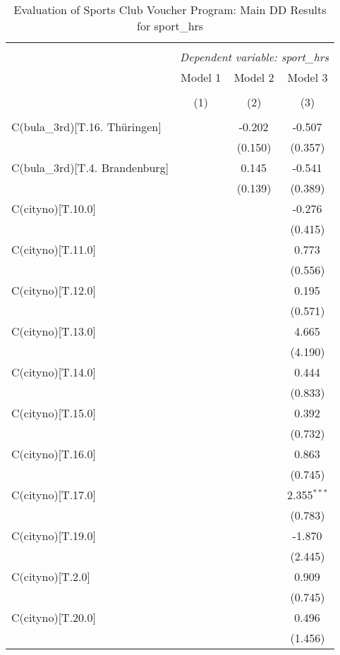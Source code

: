 \begin{table}[!htbp] \centering
  \caption{Evaluation of Sports Club Voucher Program: Main DD Results for sport_hrs}
\begin{tabular}{@{\extracolsep{5pt}}lccc}
\\[-1.8ex]\hline
\hline \\[-1.8ex]
& \multicolumn{3}{c}{\textit{Dependent variable: sport_hrs}} \
\cr \cline{2-4}
\\[-1.8ex] & \multicolumn{1}{c}{Model 1} & \multicolumn{1}{c}{Model 2} & \multicolumn{1}{c}{Model 3}  \\
\\[-1.8ex] & (1) & (2) & (3) \\
\hline \\[-1.8ex]
 C(bula_3rd)[T.16. Thüringen] & & -0.202$^{}$ & -0.507$^{}$ \\
& & (0.150) & (0.357) \\
 C(bula_3rd)[T.4. Brandenburg] & & 0.145$^{}$ & -0.541$^{}$ \\
& & (0.139) & (0.389) \\
 C(cityno)[T.10.0] & & & -0.276$^{}$ \\
& & & (0.415) \\
 C(cityno)[T.11.0] & & & 0.773$^{}$ \\
& & & (0.556) \\
 C(cityno)[T.12.0] & & & 0.195$^{}$ \\
& & & (0.571) \\
 C(cityno)[T.13.0] & & & 4.665$^{}$ \\
& & & (4.190) \\
 C(cityno)[T.14.0] & & & 0.444$^{}$ \\
& & & (0.833) \\
 C(cityno)[T.15.0] & & & 0.392$^{}$ \\
& & & (0.732) \\
 C(cityno)[T.16.0] & & & 0.863$^{}$ \\
& & & (0.745) \\
 C(cityno)[T.17.0] & & & 2.355$^{***}$ \\
& & & (0.783) \\
 C(cityno)[T.19.0] & & & -1.870$^{}$ \\
& & & (2.445) \\
 C(cityno)[T.2.0] & & & 0.909$^{}$ \\
& & & (0.745) \\
 C(cityno)[T.20.0] & & & 0.496$^{}$ \\
& & & (1.456) \\

\end{tabular}
\end{table}

